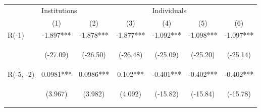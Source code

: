 \documentclass[border=0.2cm]{standalone}
\begin{document}
\begin{tabular}{lcccccc}
    \toprule
                      & \multicolumn{3}{l}{Institutions}               & \multicolumn{3}{l}{Individuals}                                                                                                                                                                                                                    \\
    \cmidrule(l){2-4} \cmidrule(l){5-7}
                      & (1)                                            & (2)                                            & (3)                                            & (4)                                            & (5)                                            & (6)                                            \\
    \midrule
    R(-1)             & -1.897***                                      & -1.878***                                      & -1.877***                                      & -1.092***                                      & -1.098***                                      & -1.097***                                      \\
    \vspace{4pt}      & \begin{footnotesize}(-27.09)\end{footnotesize} & \begin{footnotesize}(-26.50)\end{footnotesize} & \begin{footnotesize}(-26.48)\end{footnotesize} & \begin{footnotesize}(-25.09)\end{footnotesize} & \begin{footnotesize}(-25.20)\end{footnotesize} & \begin{footnotesize}(-25.14)\end{footnotesize} \\
    R(-5, -2)         & 0.0981***                                      & 0.0986***                                      & 0.102***                                       & -0.401***                                      & -0.402***                                      & -0.402***                                      \\
    \vspace{4pt}      & \begin{footnotesize}(3.967)\end{footnotesize}  & \begin{footnotesize}(3.982)\end{footnotesize}  & \begin{footnotesize}(4.092)\end{footnotesize}  & \begin{footnotesize}(-15.82)\end{footnotesize} & \begin{footnotesize}(-15.84)\end{footnotesize} & \begin{footnotesize}(-15.78)\end{footnotesize} \\

\end{tabular}
\end{document}
